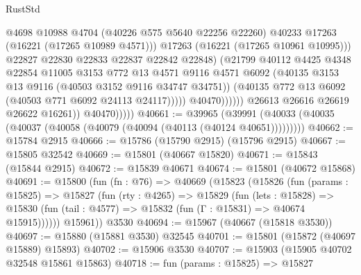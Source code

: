 \begin{lexlean}{RustStd}
\begin{coremodule}
                                        @4698
                                        @10988
                                        @4704
                                        (@40226 @575 @5640 @22256 @22260)
                                        @40233
                                        @17263
                                        (@16221 (@17265 @10989 @4571)))
                                      @17263
                                      (@16221 (@17265 @10961 @10995)))
                                    @22827
                                    @22830
                                    @22833
                                    @22837
                                    @22842
                                    @22848)
                                  (@21799
                                    @40112
                                    @4425
                                    @4348
                                    @22854
                                    @11005
                                    @3153
                                    @772
                                    @13
                                    @4571
                                    @9116
                                    @4571
                                    @6092
                                    (@40135 @3153 @13 @9116 (@40503 @3152 @9116 @34747 @34751))
                                    (@40135 @772 @13 @6092 (@40503 @771 @6092 @24113 @24117)))))
                              @40470))))))
                  @26613
                  @26616
                  @26619
                  @26622
                  @16261))
              @40470)))))
@40661 := @39965
    (@39991 (@40033 (@40035 (@40037 (@40058 (@40079 (@40094 (@40113 (@40124 @40651)))))))))
@40662 := @15784 @2915
@40666 := @15786 (@15790 @2915) (@15796 @2915)
@40667 := @15805 @32542
@40669 := @15801 (@40667 @15820)
@40671 := @15843 (@15844 @2915)
@40672 := @15839 @40671
@40674 := @15801 (@40672 @15868)
@40691 := @15800
    (fun (fn : @76) =>
    @40669
      (@15823
        (@15826
          (fun (params : @15825) =>
          @15827
            (fun (rty : @4265) =>
            @15829
              (fun (lets : @15828) =>
              @15830 (fun (tail : @4577) => @15832 (fun (Γ : @15831) => @40674 @15915))))))
        @15961))
    @3530
@40694 := @15967 (@40667 (@15818 @3530))
@40697 := @15880 (@15881 @3530) @32545
@40701 := @15801 (@15872 (@40697 @15889) @15893)
@40702 := @15906 @3530
@40707 := @15903 (@15905 @40702 @32548 @15861 @15863)
@40718 := fun (params : @15825) =>
  @15827

\end{coremodule}
\end{lexlean}

